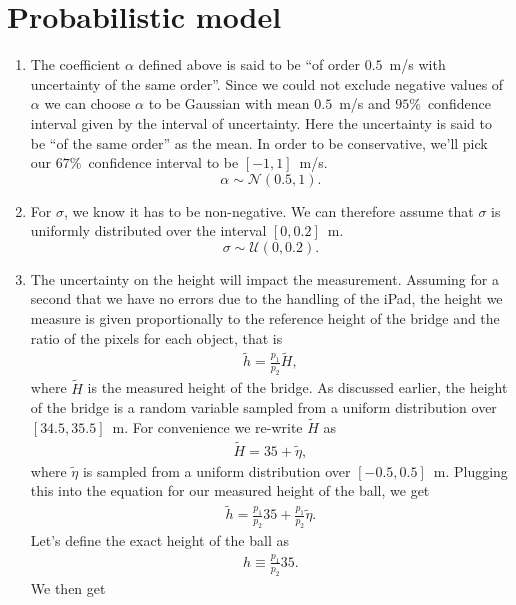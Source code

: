 \documentclass{article}
\begin{document}
\section{Probabilistic model}


\begin{enumerate}
 \item The coefficient $\alpha$ defined above is said to be ``of order
       $0.5$~m/s with uncertainty of the same order''.  
 Since we could not exclude negative values of $\alpha$ we can choose
       $\alpha$ to be Gaussian with mean $0.5$~m/s and $95\%$~confidence
       interval given by the interval of uncertainty. Here the
       uncertainty is said to be ``of the same order'' as the mean. In
       order to be conservative, we'll pick our $67\%$~confidence
       interval to be $[-1,1]$~m/s.  
\[ \alpha \sim \mathcal{N}(0.5, 1). \]
 \item For $\sigma$, we know it has to be non-negative. We can therefore
       assume that $\sigma$ is uniformly distributed over the interval
       $[0, 0.2]$~m. 
\[ \sigma \sim \mathcal{U}(0, 0.2) . \] 
 \item The uncertainty on the height will impact the
       measurement. Assuming for a second that we have no errors due to
       the handling of the iPad, the height we measure is given
       proportionally to the reference height of the bridge and the
       ratio of the pixels for each object, that is 
 \begin{align*}
  \tilde{h} = \frac{p_1}{p_2} \tilde{H},
 \end{align*}
where $\tilde{H}$ is the measured height of the bridge. As discussed
       earlier, the height of the bridge is a random variable sampled
       from a uniform distribution over $[34.5, 35.5]$~m. 
For convenience we re-write $\tilde{H}$ as
\begin{align*}
 \tilde{H} = 35 + \tilde{\eta},
\end{align*}
where $\tilde{\eta}$ is sampled from a uniform distribution over $[-0.5,
       0.5]$~m. Plugging this into the equation for our measured height
       of the ball, we get 
\begin{align*}
 \tilde{h} = \frac{p_1}{p_2} 35 + \frac{p_1}{p_2} \tilde{\eta}. 
\end{align*}
Let's define the exact height of the ball as 
\begin{align*}
 h \equiv \frac{p_1}{p_2} 35.
\end{align*}
We then get
\begin{align*}

\end{align*}
\end{enumerate}
\end{document}
